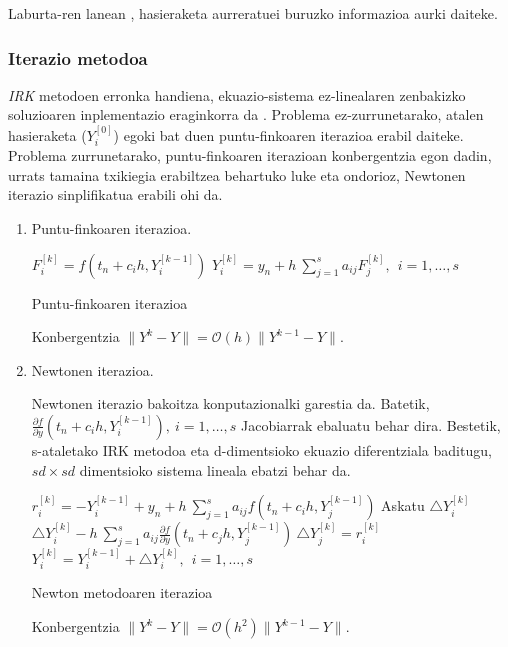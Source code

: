 Laburta-ren lanean \cite{Laburta1998}, hasieraketa aurreratuei buruzko informazioa aurki daiteke.  


\subsubsection*{Iterazio metodoa}

\emph{IRK} metodoen erronka handiena, ekuazio-sistema ez-linealaren zenbakizko soluzioaren inplementazio eraginkorra da \cite{Hairer2006,SSerna2015b}. Problema ez-zurrunetarako, atalen hasieraketa ($Y_i^{[0]}$) egoki bat duen puntu-finkoaren iterazioa erabil daiteke. Problema zurrunetarako, puntu-finkoaren iterazioan konbergentzia egon dadin, urrats tamaina txikiegia erabiltzea behartuko luke eta ondorioz, Newtonen iterazio sinplifikatua erabili ohi da.  

\begin{enumerate}

\item Puntu-finkoaren iterazioa.

\begin{algorithm}[H]
  {
   $F_{i}^{[k]}=f(t_n+c_ih,Y_i^{[k-1]})$\;
   $Y_{i}^{[k]}=y_{n}+ h \ \sum\limits_{j=1}^{s} a_{ij} F_{j}^{[k]} , \ \  i=1,\dots,s$\; 
  }
 \caption{Puntu-finkoaren iterazioa}
 \label{alg:rkpf}
\end{algorithm}

Konbergentzia $\|Y^k-Y\|=\mathcal{O}(h) \|Y^{k-1}-Y\|$.


\item Newtonen iterazioa. 

Newtonen iterazio bakoitza konputazionalki garestia da. Batetik,  $\frac{\partial f}{\partial y}(t_n+c_ih,Y_i^{[k-1]}), \ i=1,\dots,s$ Jacobiarrak ebaluatu behar dira. Bestetik, s-ataletako IRK metodoa eta  d-dimentsioko ekuazio diferentziala baditugu, $sd \times sd$ dimentsioko sistema lineala ebatzi behar da.    

\begin{algorithm}[H]
  {
   $r_{i}^{[k]}=-Y_i^{[k-1]}+y_n+h \ \sum\limits_{j=1}^{s} a_{ij} f(t_n+c_ih,Y_j^{[k-1]}) $\;
   Askatu $\triangle Y_i^{[k]}$\;
   $\triangle Y_i^{[k]}-h \ \sum\limits_{j=1}^{s} a_{ij} \frac{\partial f}{\partial y}(t_n+c_jh,Y_j^{[k-1]}) \ \triangle Y_j^{[k]}=r_i^{[k]}$\;
   $Y_i^{[k]}=Y_i^{[k-1]}+\triangle Y_i^{[k]}, \ \  i=1,\dots,s$\; 
  }
 \caption{Newton metodoaren iterazioa}
\end{algorithm}

Konbergentzia $\|Y^k-Y\|=\mathcal{O}(h^2) \|Y^{k-1}-Y\|$.

\end{enumerate}


